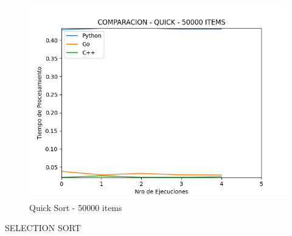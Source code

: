 \documentclass[12pt]{article} %
\begin{document}
    \begin{figure}[H]
    \centering
    \includegraphics[width=\textwidth]{quick_50000}
    \caption{Quick Sort - 50000 items}
    \end{figure}

    \vspace{8cm}










SELECTION SORT
\end{document}
